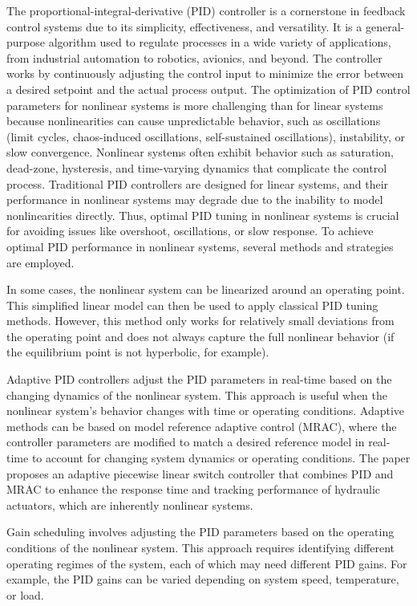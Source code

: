 \documentclass[preprint,12pt]{elsarticle}
\begin{document}
The proportional-integral-derivative (PID) controller is a cornerstone in feedback control systems due to its simplicity, effectiveness, and versatility. It is a general-purpose algorithm used to regulate processes in a wide variety of applications, from industrial automation to robotics, avionics, and beyond. The controller works by continuously adjusting the control input to minimize the error between a desired setpoint and the actual process output. The optimization of PID control parameters for nonlinear systems is more challenging than for linear systems because nonlinearities can cause unpredictable behavior, such as oscillations (limit cycles, chaos-induced oscillations, self-sustained oscillations), instability, or slow convergence. Nonlinear systems often exhibit behavior such as saturation, dead-zone, hysteresis, and time-varying dynamics that complicate the control process. Traditional PID controllers are designed for linear systems, and their performance in nonlinear systems may degrade due to the inability to model nonlinearities directly. Thus, optimal PID tuning in nonlinear systems is crucial for avoiding issues like overshoot, oscillations, or slow response. To achieve optimal PID performance in nonlinear systems, several methods and strategies are employed.


In some cases, the nonlinear system can be linearized around an operating point. This simplified linear model can then be used to apply classical PID tuning methods. However, this method only works for relatively small deviations from the operating point and does not always capture the full nonlinear behavior (if the equilibrium point is not hyperbolic, for example).

Adaptive PID controllers adjust the PID parameters in real-time based on the changing dynamics of the nonlinear system. This approach is useful when the nonlinear system's behavior changes with time or operating conditions. Adaptive methods can be based on model reference adaptive control (MRAC), where the controller parameters are modified to match a desired reference model in real-time to account for changing system dynamics or operating conditions. The paper \cite{Zuo2017adaptivePID} proposes an adaptive piecewise linear switch controller that combines PID and MRAC to enhance the response time and tracking performance of hydraulic actuators, which are inherently nonlinear systems.

Gain scheduling involves adjusting the PID parameters based on the operating conditions of the nonlinear system. This approach requires identifying different operating regimes of the system, each of which may need different PID gains. For example, the PID gains can be varied depending on system speed, temperature, or load.
\end{document}
